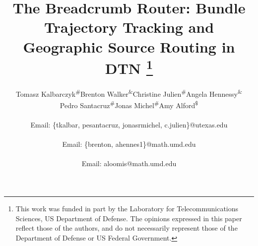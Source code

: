 \title{The Breadcrumb Router: Bundle Trajectory Tracking and Geographic Source Routing in DTN
\thanks{This work was funded in part by the Laboratory
for Telecommunications Sciences, US Department of Defense.  The opinions
expressed in this paper reflect those of the authors, and do not
necessarily represent those of the Department of Defense or US Federal
Government.}}

\author{
\alignauthor
Tomasz Kalbarczyk\textsuperscript{\#}\quad Brenton
Walker\textsuperscript{\&}\quad Christine
Julien\textsuperscript{\#}\quad Angela
Hennessy\textsuperscript{\&}\quad\\
Pedro
Santacruz\textsuperscript{\#}\quad Jonas Michel\textsuperscript{\#}\quad Amy
Alford\textsuperscript{\$}\quad \\  
\\
Email: \{tkalbar, pesantacruz, jonasrmichel, c.julien\}@utexas.edu\\
\\
Email: \{brenton, ahennes1\}@math.umd.edu\\
\\
Email: aloomis@math.umd.edu
}



\maketitle
